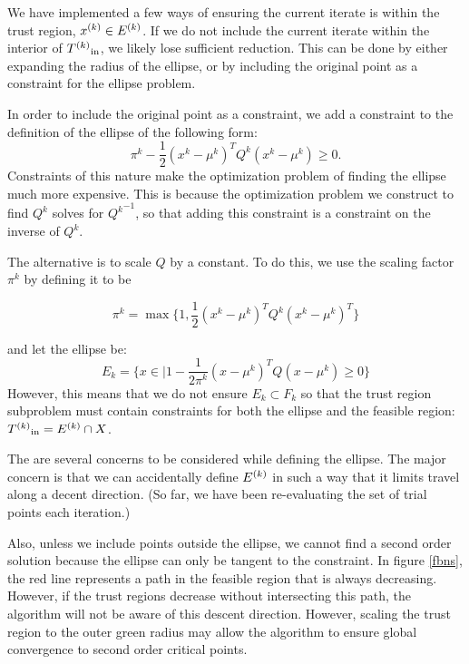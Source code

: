 We have implemented a few ways of ensuring the current iterate is within the trust region, ${x}^{(k)} \in {E^{(k)}}$.
If we do not include the current iterate within the interior of ${T^{(k)}}_{\text{in}}$, we likely lose sufficient reduction.
This can be done by either expanding the radius of the ellipse, or by including the original point as a constraint for the ellipse problem.


In order to include the original point as a constraint, we add a constraint to the definition of the ellipse of the following form:
$$ \pi^k - \frac 1 2 (x^k - \mu^{k})^TQ^{k}(x^k - \mu^{k}) \ge 0. $$
Constraints of this nature make the optimization problem of finding the ellipse much more expensive.
This is because the optimization problem we construct to find $Q^k$ solves for ${Q^k}^{-1}$, so that adding this constraint is a constraint on the inverse of $Q^k$.


The alternative is to scale $Q$ by a constant.
To do this, we use the scaling factor $\pi^k$ by defining it to be

$$\pi^k = \max \{1, \frac 1 {2} (x^{k} - \mu^{k})^T Q^k (x^{k} - \mu^{k})^T \}$$

and let the ellipse be:
$$E_k = \{x \in \mathbb | 1 - \frac 1 {2\pi^k} (x - \mu^{k})^T Q (x - \mu^{k}) \ge 0\} $$
However, this means that we do not ensure $E_k \subset F_k$ so that the trust region subproblem must contain constraints for both the ellipse and the feasible region: ${T^{(k)}}_{\text{in}} = {E^{(k)}} \cap X$.

The are several concerns to be considered while defining the ellipse.
The major concern is that we can accidentally define ${E^{(k)}}$ in such a way that it limits travel along a decent direction.
(So far, we have been re-evaluating the set of trial points each iteration.)


Also, unless we include points outside the ellipse, we cannot find a second order solution because the ellipse can only be tangent to the constraint.
In figure \cref{fbns}, the red line represents a path in the feasible region that is always decreasing.
However, if the trust regions decrease without intersecting this path, the algorithm will not be aware of this descent direction.
However, scaling the trust region to the outer green radius may allow the algorithm to ensure global convergence to second order critical points.

